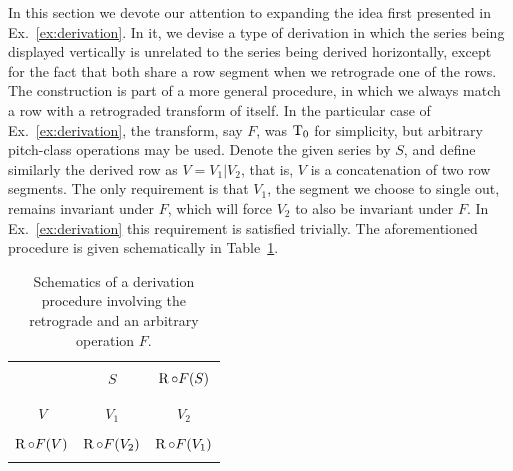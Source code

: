 In this section we devote our attention to expanding the idea first presented in Ex.~\ref{ex:derivation}. In it, we devise a type of derivation in which the series being displayed vertically is unrelated to the series being derived horizontally, except for the fact that both share a row segment when we retrograde one of the rows. The construction is part of a more general procedure, in which we always match a row with a retrograded transform of itself. In the particular case of Ex.~\ref{ex:derivation}, the transform, say $F$, was $\operatorname{T}_0$ for simplicity, but arbitrary pitch-class operations may be used. Denote the given series by $S$, and define similarly the derived row as $V = V_1 | V_2$, that is, $V$ is a concatenation of two row segments. The only requirement is that $V_1$, the segment we choose to single out, remains invariant under $F$, which will force $V_2$ to also be invariant under $F$. In Ex.~\ref{ex:derivation} this requirement is satisfied trivially. The aforementioned procedure is given schematically in Table~\ref{derivation-retrograde}.

\begin{table}[htbp]
    \caption[Derivation Involving the Retrograde and an Arbitrary Operation]{Schematics of a derivation procedure involving the retrograde and an arbitrary operation $F$.}
    \label{derivation-retrograde}
    \centering
    \vspace{12pt}
    \begin{tabular}{c|cc}
        \hline\\
        & $S$ & $\operatorname{R} \circ F(S)$\\\\
        \hline\\
        $V$ & $V_1$ & $V_2$ \\\\
        $\operatorname{R} \circ F(V)$ & $\operatorname{R} \circ F(V_2)$ & $\operatorname{R} \circ F(V_1)$ \\\\
        \hline
    \end{tabular}
\end{table}

